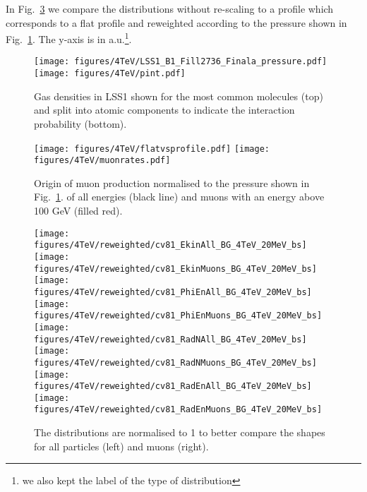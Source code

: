In Fig.~\ref{reweighted1} we compare the distributions without re-scaling to a profile which corresponds to a flat profile and reweighted according to the pressure shown in Fig.~\ref{pressure2012}. The y-axis is in a.u.\footnote{we also kept the label of the type of distribution}.

\begin{figure}[!htb]
\begin{center}
  \texttt{[image: figures/4TeV/LSS1\_B1\_Fill2736\_Finala\_pressure.pdf]}
  \texttt{[image: figures/4TeV/pint.pdf]}
\end{center}
\vspace{-0.6cm}
 \caption{Gas densities in LSS1 shown for the most common molecules (top) and split into atomic components to indicate the interaction probability (bottom).
  \label{pressure2012}}
\end{figure}

\begin{figure}[!htb]
\begin{center}
  \texttt{[image: figures/4TeV/flatvsprofile.pdf]}
  \texttt{[image: figures/4TeV/muonrates.pdf]}
\end{center}
\vspace{-0.6cm}
 \caption{Origin of muon production normalised to the pressure shown in Fig.~\ref{pressure2012}. of all energies (black line) and muons with an energy above 100 GeV (filled red).
  \label{normed}}
\end{figure}


\begin{figure}
\begin{center}
  \texttt{[image: figures/4TeV/reweighted/cv81\_EkinAll\_BG\_4TeV\_20MeV\_bs]}
  \texttt{[image: figures/4TeV/reweighted/cv81\_EkinMuons\_BG\_4TeV\_20MeV\_bs]}
  \texttt{[image: figures/4TeV/reweighted/cv81\_PhiEnAll\_BG\_4TeV\_20MeV\_bs]}
  \texttt{[image: figures/4TeV/reweighted/cv81\_PhiEnMuons\_BG\_4TeV\_20MeV\_bs]}
  \texttt{[image: figures/4TeV/reweighted/cv81\_RadNAll\_BG\_4TeV\_20MeV\_bs]}
  \texttt{[image: figures/4TeV/reweighted/cv81\_RadNMuons\_BG\_4TeV\_20MeV\_bs]}
  \texttt{[image: figures/4TeV/reweighted/cv81\_RadEnAll\_BG\_4TeV\_20MeV\_bs]}
  \texttt{[image: figures/4TeV/reweighted/cv81\_RadEnMuons\_BG\_4TeV\_20MeV\_bs]}
\end{center}
\vspace{-0.6cm}
 \caption{The distributions are normalised to 1 to better compare the shapes for all particles (left) and muons (right).
  \label{reweighted1}} 
\end{figure}


